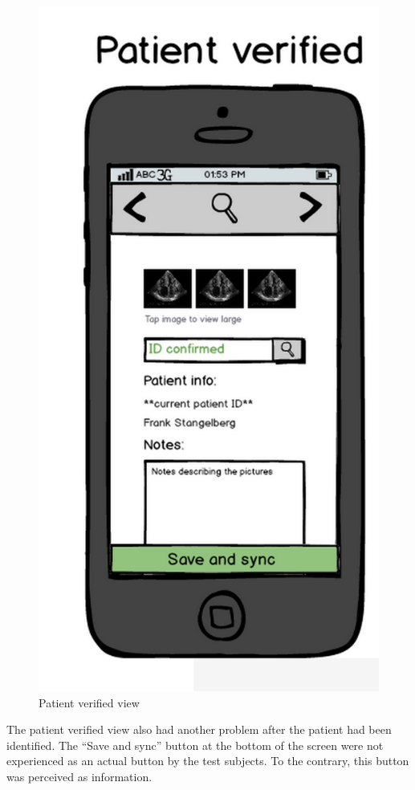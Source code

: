 \begin{figure}[H]
\centering
\includegraphics[scale=0.20]{img/mockups/patient_verified.png}
\caption{Patient verified view}
\label{verifymock}
\end{figure}
The patient verified view also had another problem after the patient had been identified. The “Save and sync” button at the bottom of the screen were not experienced as an actual button by the test subjects. To the contrary, this button was perceived as information.

